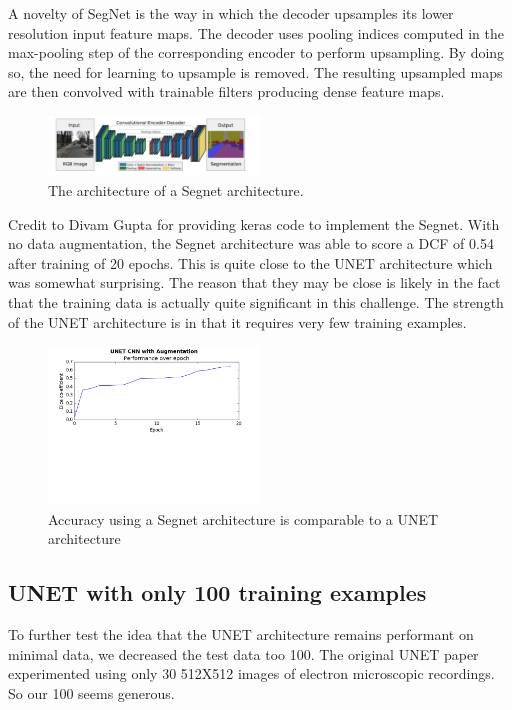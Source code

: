 \documentclass[letterpaper]{article}
\begin{document}
A novelty of SegNet  is the way in which the decoder upsamples its lower resolution input feature maps. The decoder uses pooling indices computed in the max-pooling step of the corresponding encoder to perform upsampling. By doing so, the need for learning to upsample is removed. The resulting upsampled maps are then convolved with trainable filters producing dense feature maps. 

 \begin{figure}[H]
  \centerline{\includegraphics[width=0.5\textwidth]{Images/SegNetArchitecture.png}}
  \caption{The architecture of a Segnet architecture.}
  \label{fig:segnet}
\end{figure}


Credit to Divam Gupta for providing keras code to implement the Segnet. \cite{segnetimplementation}With no data augmentation, the Segnet architecture was able to score a DCF of 0.54 after training of 20 epochs. This is quite close to the UNET architecture which was somewhat surprising. The reason that they may be close is likely in the fact that the training data is actually quite significant in this challenge. The strength of the UNET architecture is in that it requires very few training examples.


 \begin{figure}[H]
  \centerline{\includegraphics[width=0.5\textwidth]{Plots/SegNet.png}}
  \caption{Accuracy using a Segnet architecture is comparable to a UNET architecture}
  \label{fig:trainingovertime2.}
\end{figure}

\subsection{UNET with only 100 training examples}
To further test the idea that the UNET architecture remains performant on minimal data, we decreased the test data too 100. The original UNET paper experimented using only 30 512X512 images of electron microscopic recordings. So our 100 seems generous. 
\end{document}
